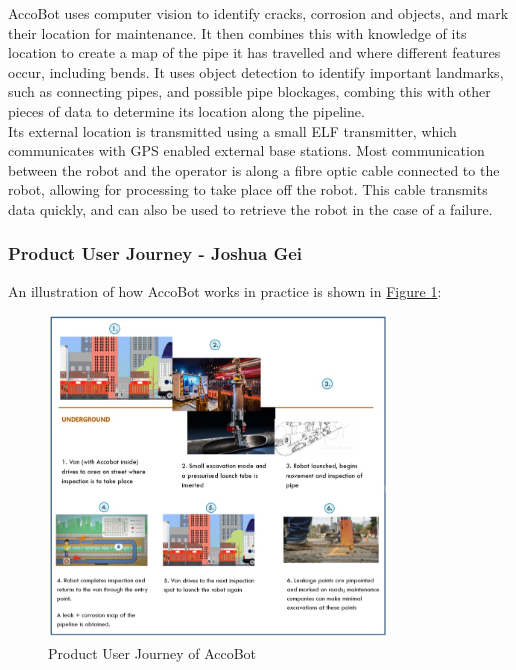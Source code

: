 \documentclass[11pt]{article}		%
\newcommand{\figref}[1]{\hyperref[#1]{Figure \ref*{#1}}}    %
\begin{document}
			\hspace*{3ex} AccoBot uses computer vision to identify cracks, corrosion and objects, and mark their location for maintenance.
			It then combines this with knowledge of its location to create a map of the pipe it has travelled and where different features occur, including bends.
			It uses object detection to identify important landmarks, such as connecting pipes, and possible pipe blockages, combing this with other pieces of data to determine its location along the pipeline.
			\\
			\hspace*{3ex} Its external location is transmitted using a small ELF transmitter, which communicates with GPS enabled external base stations. 
			Most communication between the robot and the operator is along a fibre optic cable connected to the robot, allowing for processing to take place off the robot.
			This cable transmits data quickly, and can also be used to retrieve the robot in the case of a failure.
			
			\subsubsection[Product User Journey]{Product User Journey - Joshua Gei} \label{userJourney}
			
            An illustration of how AccoBot works in practice is shown in \figref{userjourney}:
	        \begin{figure}[h]
				\centering
				\includegraphics[width=0.8\textwidth]{userjourneyfull.jpg}
				\caption{Product User Journey of AccoBot}
				\label{userjourney}
			\end{figure}
\end{document}
